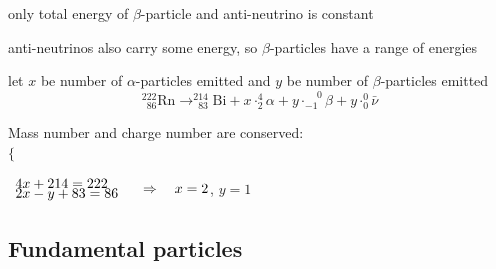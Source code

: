 only total energy of $\beta$-particle and anti-neutrino is constant

anti-neutrinos also carry some energy, so $\beta$-particles have a range of energies


\begin{soln} let $x$ be number of $\alpha$-particles emitted and $y$ be number of $\beta$-particles emitted
\begin{equation*}
	^{222}_{\phantom{2}86}\text{Rn} \longrightarrow ^{214}_{\phantom{2}83}\text{Bi} + x \cdot ^4_2 \alpha + y \cdot _{-1}^{\phantom{+}0}\beta + y \cdot _0^0 \bar{\nu}
\end{equation*}

Mass number and charge number are conserved:\\ 
$\Bigg\{$

\vspace*{-1.58\baselineskip}\hspace*{18pt} $\begin{array}{l}
4x + 214 = 222\\[-5pt]
2x - y + 83 = 86
\end{array} \quad \Rightarrow \quad x = 2$, $y=1$ \end{soln}



\subsection{Fundamental particles}

